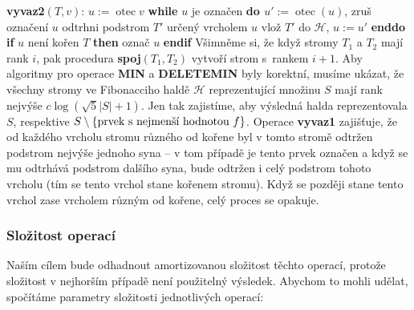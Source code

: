 \documentclass[a4paper,12pt]{article}
\DeclareMathOperator*{\otec}{otec}
\begin{document}
{\bf vyvaz2$(T,v)$}:\newline 
$u:=\otec v$\newline 
{\bf while} $u$ je označen {\bf do\newline 
\phantom{{\rm ---}}$u':=\otec(u)$}, zruš označení $u$\newline 
\phantom{---}odtrhni podstrom $T'$ určený vrcholem $u$\newline 
\phantom{---}vlož $T'$ do $\mathcal H$, $u:=u'$\newline 
{\bf enddo\newline 
if} $u$ není kořen $T$ {\bf then} označ $u$ {\bf endif
}
Všimněme si, že když stromy $T_1$ a $T_2$ mají rank 
$i$, pak procedura {\bf spoj$(T_1,T_2)$} vytvoří strom s~rankem 
$i+1$.  Aby algoritmy pro operace {\bf MIN} a {\bf DELETEMIN} byly 
korektní, musíme ukázat, že všechny stromy ve 
Fibonacciho haldě $\mathcal H$ reprezentující množinu $
S$ mají rank 
nejvýše $c\log(\sqrt 5|S|+1)$. Jen tak zajistíme, aby výsledná 
halda reprezentovala $S$, res\-pektive 
$S\setminus \{\text{\rm prvek s~nejmenší hodnotou }f\}$.  Operace {\bf vyvaz1 }
zajišťuje, že od každého vrcholu stromu různého 
od kořene byl v tomto stromě odtržen podstrom nejvýše 
jednoho syna -- v tom případě je tento prvek označen a 
když se mu odtrhává podstrom dalšího syna, bude odtržen 
i celý podstrom tohoto vrcholu (tím se tento vrchol stane kořenem 
stromu).  Když se později stane tento vrchol zase 
vrcholem různým od kořene, celý proces se 
opakuje. 

\subsubsection{Složitost operací}

Naším cílem bude odhadnout amortizovanou složitost těchto 
operací, protože složitost v nejhorším případě není 
použitelný výsledek.  Abychom to mohli udělat, spočítáme parametry 
složitosti jednotlivých operací:  
\end{document}
